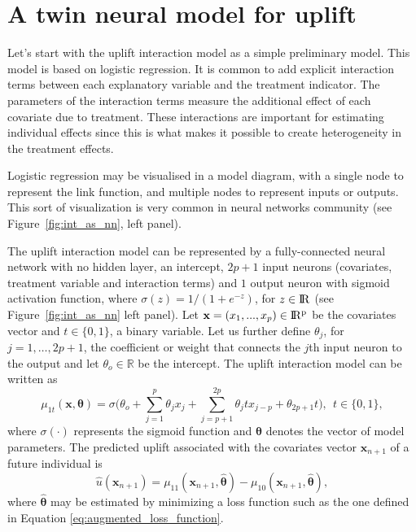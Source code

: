 \documentclass{article}
\def\x{\mathbf x}
\def \real{\rm I\!R}
\begin{document}
\section{A twin neural model for uplift}

Let's start with the uplift interaction model \citep{lo2002true} as a simple preliminary model. This model is based on logistic regression. It is common to add explicit interaction terms between each explanatory variable and the treatment indicator. The parameters of the interaction terms measure the additional effect of each covariate due to treatment. These interactions are important for estimating individual effects since this is what makes it possible to create heterogeneity in the treatment effects. 

Logistic regression may be visualised in a model diagram, with a single node to represent the link function, and multiple nodes to represent inputs or outputs. This sort of visualization is very common in neural networks community (see Figure~\ref{fig:int_as_nn}, left panel). 

The uplift interaction model can be represented by a fully-connected neural network with no hidden layer, an intercept, $2p+1$ input neurons (covariates, treatment variable and interaction terms) and $1$ output neuron with sigmoid activation function, where $\sigma(z)=1/(1+e^{-z})$, for $z \in \real$ (see Figure~\ref{fig:int_as_nn} left panel). Let $\x = (x_1,...,x_p) \in \real^{p}$ be the covariates vector and $t \in \{0,1\}$, a binary variable. Let us further define $\theta_{j}$, for $j=1,\ldots,2p+1$, the coefficient or weight that connects the $j$th input neuron to the output and let $\theta_o \in \mathbb{R}$ be the intercept.
%
The uplift interaction model can be written as
\begin{equation}
    \mu_{1t}(\x, \boldsymbol{\theta}) = \sigma \Big(\theta_o + \sum_{j=1}^{p} \theta_j x_j + \sum_{j=p+1}^{2p} \theta_j t x_{j-p} +  \theta_{2p+1} t  \Big), ~~ t \in \{0,1\},
    \label{eq:neural_network_1}
\end{equation}
where $\sigma(\cdot)$ represents the sigmoid function and $\boldsymbol{\theta}$ denotes the vector of model parameters. The predicted uplift associated with the covariates vector $\mathbf{x}_{n+1}$ of a future individual is 
$$ \hat{u}(\mathbf{x}_{n+1}) = \mu_{11}(\x_{n+1}, \boldsymbol{\hat{\theta}}) - \mu_{10}(\x_{n+1}, \boldsymbol{\hat{\theta}}),$$
where $\boldsymbol{\hat{\theta}}$ may be estimated by minimizing a loss function such as the one defined in Equation \eqref{eq:augmented_loss_function}.
\end{document}
